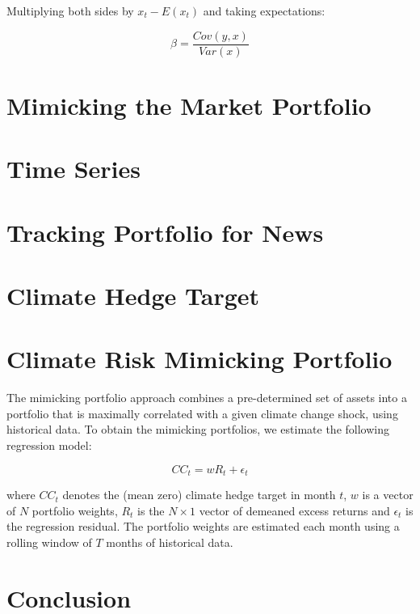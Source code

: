Multiplying both sides by $x_t - E(x_t)$ and taking expectations:


\begin{equation}
    \label{eq:population}
    \beta = \frac{Cov(y,x)}{Var(x)}
\end{equation}


\section{Mimicking the Market Portfolio}


\section{Time Series}

\section{Tracking Portfolio for News}

\section{Climate Hedge Target}

\section{Climate Risk Mimicking Portfolio}

The mimicking portfolio approach combines a pre-determined set of 
assets into a portfolio that is maximally correlated with a given 
climate change shock, using historical data. To obtain the mimicking
portfolios, we estimate the following regression model:

\begin{equation}
    \label{eq:regression}
    CC_t = w R_t + \epsilon_t
\end{equation}

where $CC_t$ denotes the (mean zero) climate hedge target in month $t$,
$w$ is a vector of $N$ portfolio weights, $R_t$ is the $N \times 1$ vector 
of demeaned excess returns and $\epsilon_t$ is the regression residual.
The portfolio weights are estimated each month using a rolling window of
$T$ months of historical data. 

    
    

\section{Conclusion}